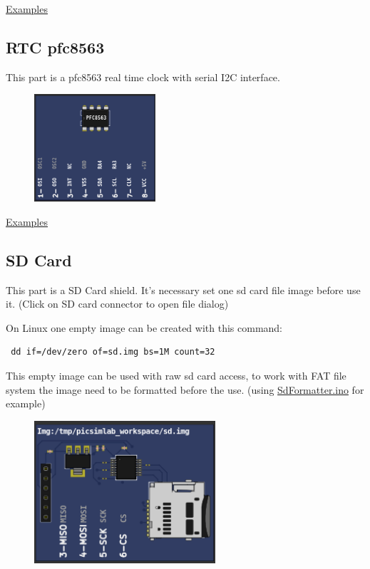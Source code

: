 \href{https://lcgamboa.github.io/picsimlab_examples/Parts.html\#RTC_ds1307}{Examples}


\subsection{RTC pfc8563}

This part is a pfc8563 real time clock with serial I2C interface.

\begin{figure}[H]
\center
\includegraphics[width=0.4\textwidth]{img/part_pcf8563.png} 
\end{figure}

\href{https://lcgamboa.github.io/picsimlab_examples/Parts.html\#RTC_pfc8563}{Examples}


\subsection{SD Card}

This part is a SD Card shield. It's necessary set one sd card file image before use it. (Click on SD card connector to open file dialog)

On Linux one empty image can be created with this command: 
\begin{verbatim}
 dd if=/dev/zero of=sd.img bs=1M count=32
\end{verbatim}
This empty image can be used with raw sd card access, to work with FAT file system  the image need to be formatted before the use. (using \href{https://github.com/greiman/SdFat/blob/master/examples/SdFormatter/SdFormatter.ino}{SdFormatter.ino} for example) 

\begin{figure}[H]
\center
\includegraphics[width=0.6\textwidth]{img/part_sdcard.png} 
\end{figure} 


